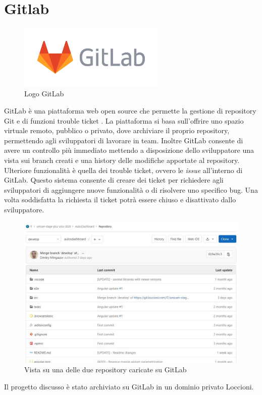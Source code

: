 \pagebreak
\section{Gitlab}
\begin{figure}[ht!]
\begin{center}
  \includegraphics[width=7cm]{images/gitlab_logo.png}
  \caption{Logo GitLab}
\end{center}
\end{figure}
GitLab è una piattaforma web open source che permette la gestione di repository Git e di funzioni trouble ticket \cite{GITLAB}.
La piattaforma si basa sull'offrire uno spazio virtuale remoto, pubblico o privato, dove archiviare il proprio repository, permettendo agli sviluppatori di lavorare in team.
Inoltre GitLab consente di avere un controllo più immediato mettendo a disposizione dello sviluppatore una vista sui branch creati e una history delle modifiche apportate al repository.
Ulteriore funzionalità è quella dei trouble ticket, ovvero le \textit{issue} all'interno di GitLab. Questo sistema consente di creare dei ticket per richiedere agli sviluppatori di aggiungere nuove funzionalità o di risolvere uno specifico bug. Una volta soddisfatta la richiesta il ticket potrà essere chiuso e disattivato dallo sviluppatore.
\begin{figure}[ht!]
\begin{center}
  \includegraphics[width=13cm]{images/Repository_GitLab.JPG}
  \caption{Vista su una delle due repository caricate su GitLab}
\end{center}
\end{figure}
Il progetto discusso è stato archiviato su GitLab in un dominio privato Loccioni.

